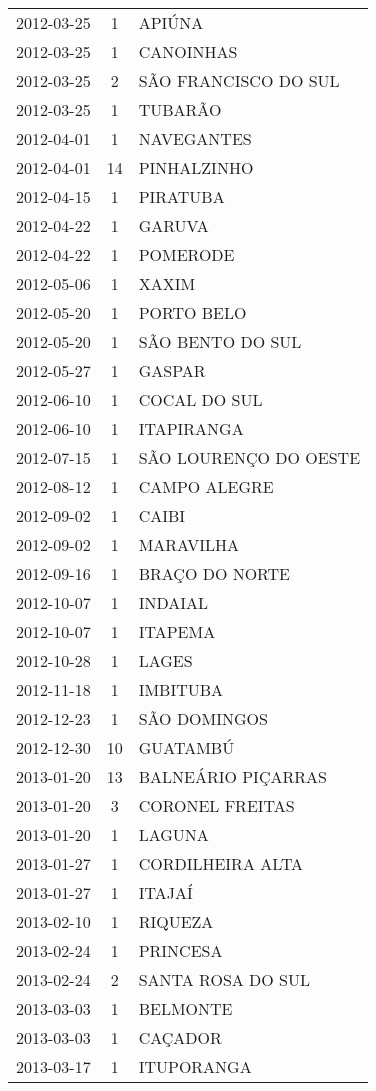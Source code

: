 \begin{longtable}[htbp]{ccl}
2012-03-25 & 1 & APIÚNA \\
2012-03-25 & 1 & CANOINHAS \\
2012-03-25 & 2 & SÃO FRANCISCO DO SUL \\
2012-03-25 & 1 & TUBARÃO \\
2012-04-01 & 1 & NAVEGANTES \\
2012-04-01 & 14 & PINHALZINHO \\
2012-04-15 & 1 & PIRATUBA \\
2012-04-22 & 1 & GARUVA \\
2012-04-22 & 1 & POMERODE \\
2012-05-06 & 1 & XAXIM \\
2012-05-20 & 1 & PORTO BELO \\
2012-05-20 & 1 & SÃO BENTO DO SUL \\
2012-05-27 & 1 & GASPAR \\
2012-06-10 & 1 & COCAL DO SUL \\
2012-06-10 & 1 & ITAPIRANGA \\
2012-07-15 & 1 & SÃO LOURENÇO DO OESTE \\
2012-08-12 & 1 & CAMPO ALEGRE \\
2012-09-02 & 1 & CAIBI \\
2012-09-02 & 1 & MARAVILHA \\
2012-09-16 & 1 & BRAÇO DO NORTE \\
2012-10-07 & 1 & INDAIAL \\
2012-10-07 & 1 & ITAPEMA \\
2012-10-28 & 1 & LAGES \\
2012-11-18 & 1 & IMBITUBA \\
2012-12-23 & 1 & SÃO DOMINGOS \\
2012-12-30 & 10 & GUATAMBÚ \\
2013-01-20 & 13 & BALNEÁRIO PIÇARRAS \\
2013-01-20 & 3 & CORONEL FREITAS \\
2013-01-20 & 1 & LAGUNA \\
2013-01-27 & 1 & CORDILHEIRA ALTA \\
2013-01-27 & 1 & ITAJAÍ \\
2013-02-10 & 1 & RIQUEZA \\
2013-02-24 & 1 & PRINCESA \\
2013-02-24 & 2 & SANTA ROSA DO SUL \\
2013-03-03 & 1 & BELMONTE \\
2013-03-03 & 1 & CAÇADOR \\
2013-03-17 & 1 & ITUPORANGA \\

\end{longtable}
